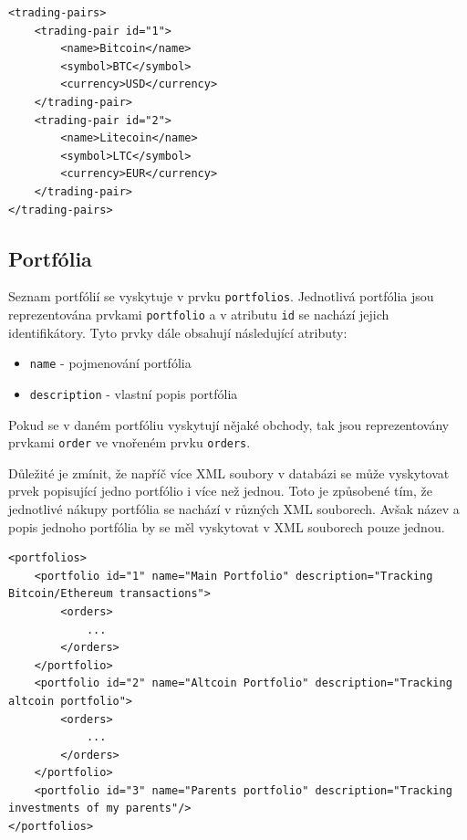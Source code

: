 \documentclass[12pt, a4paper]{article}
\begin{document}
\begin{lstlisting}
<trading-pairs>
    <trading-pair id="1">
        <name>Bitcoin</name>
        <symbol>BTC</symbol>
        <currency>USD</currency>
    </trading-pair>
    <trading-pair id="2">
        <name>Litecoin</name>
        <symbol>LTC</symbol>
        <currency>EUR</currency>
    </trading-pair>
</trading-pairs>
\end{lstlisting}

\subsection{Portfólia}
Seznam portfólií se vyskytuje v prvku \texttt{portfolios}. Jednotlivá portfólia jsou reprezentována prvkami \texttt{portfolio} a v atributu \texttt{id} se nachází jejich identifikátory. Tyto prvky dále obsahují následující atributy:

\begin{itemize}
    \item \texttt{name} - pojmenování portfólia
    \item \texttt{description} - vlastní popis portfólia
\end{itemize}

Pokud se v daném portfóliu vyskytují nějaké obchody, tak jsou reprezentovány prvkami \texttt{order} ve vnořeném prvku \texttt{orders}.

Důležité je zmínit, že napříč více XML soubory v databázi se může vyskytovat prvek popisující jedno portfólio i více než jednou. Toto je způsobené tím, že jednotlivé nákupy portfólia se nachází v různých XML souborech. Avšak název a popis jednoho portfólia by se měl vyskytovat v XML souborech pouze jednou.

\begin{lstlisting}
<portfolios>
    <portfolio id="1" name="Main Portfolio" description="Tracking Bitcoin/Ethereum transactions">
        <orders>
            ...
        </orders>
    </portfolio>
    <portfolio id="2" name="Altcoin Portfolio" description="Tracking altcoin portfolio">
        <orders>
            ...
        </orders>
    </portfolio>
    <portfolio id="3" name="Parents portfolio" description="Tracking investments of my parents"/>
</portfolios>

\end{lstlisting}
\end{document}
